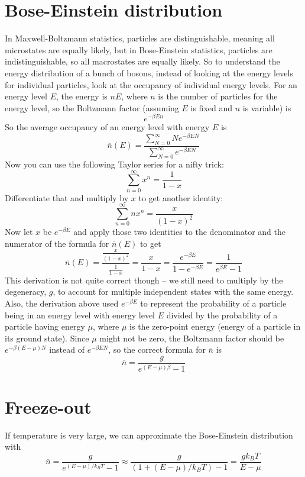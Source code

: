 \documentclass[12pt]{article}
\begin{document}
\section{Bose-Einstein distribution}
In Maxwell-Boltzmann statistics, particles are distinguishable, meaning all microstates are equally likely, but in Bose-Einstein statistics, particles are indistinguishable, so all macrostates are equally likely. So to understand the energy distribution of a bunch of bosons, instead of looking at the energy levels for individual particles, look at the occupancy of individual energy levels. For an energy level $E$, the energy is $nE$, where $n$ is the number of particles for the energy level, so the Boltzmann factor (assuming $E$ is fixed and $n$ is variable) is
\[e^{- \beta E n}\]
So the average occupancy of an energy level with energy $E$ is
\[\overline{n}(E) = \frac{\sum\limits_{N=0}^\infty N e^{- \beta E N}}{\sum\limits_{N=0}^\infty e^{- \beta E N}}\]
Now you can use the following Taylor series for a nifty trick:
\[\sum_{n=0}^\infty x^n = \frac{1}{1 - x} \]
Differentiate that and multiply by $x$ to get another identity:
\[\sum_{n=0}^\infty nx^n = \frac{x}{(1-x)^2} \]
Now let $x$ be $e^{-\beta E}$ and apply those two identities to the denominator and the numerator of the formula for $\overline{n}(E)$ to get
\[\overline{n}(E) = \frac{ \frac{x}{(1-x)^2} }{ \frac{1}{1-x} } = \frac{x}{1 - x} = \frac{e^{-\beta E}}{1 - e^{-\beta E}} = \frac{1}{e^{\beta E} - 1} \]
This derivation is not quite correct though -- we still need to multiply by the degeneracy, $g$, to account for multiple independent states with the same energy. Also, the derivation above used $e^{-\beta E}$ to represent the probability of a particle being in an energy level with energy level $E$ divided by the probability of a particle having energy $\mu$, where $\mu$ is the zero-point energy (energy of a particle in its ground state). Since $\mu$ might not be zero, the Boltzmann factor should be $e^{-\beta (E - \mu) N}$ instead of $e^{-\beta E N}$, so the correct formula for $\overline{n}$ is
\[\overline{n} = \frac{g}{e^{(E - \mu) \beta} - 1} \]

\section{Freeze-out}
If temperature is very large, we can approximate the Bose-Einstein distribution with
\[\overline{n} = \frac{g}{e^{(E - \mu) / k_B T} - 1} \approx \frac{g}{(1 + (E - \mu) / k_B T) - 1} = \frac{g k_B T}{E - \mu}\]
\end{document}
